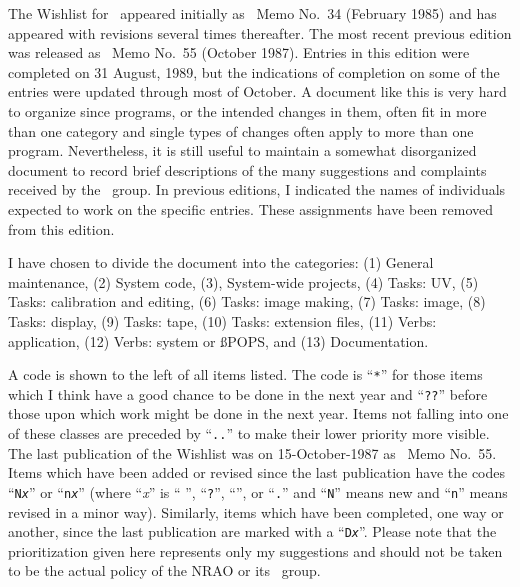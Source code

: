 \def\ust{{\rm st}}
\def\uth{{\rm th}}
\def\und{{\rm nd}}
\def\urd{{\rm rd}}
\def\fresh{\hfil\break}
\def\uv{{\it uv\/}}
\def\eg{{\it e.g.},}
\def\ie{{\it i.e.},}
\def\Uv{{\it Uv\/}}
\def\Eg{{\it E.g.},}
\def\Ie{{\it I.e.},}

\nopagenumbers

\def\stitle{NO STITLE}
\def\mdate{NO MDATE}
\def\ftitle{NO FTITLE}
\def\author{NO AUTHOR}
\def\stitle{\AIPS\ Wishlist}
\def\ftitle{The AIPS Wishlist}
\def\author{Eric W. Greisen}
\def\mdate{31 August 1989}
\def\memnumb{62}
\def\memnumc{\phantom{9}}
\memobegin


     The Wishlist for \AIPS\ appeared initially as \Aips\ Memo
No.~34 (February 1985) and has appeared with revisions several
times thereafter.  The most recent previous edition was released
as \AIPS\ Memo No.~55 (October 1987).  Entries in this edition were
completed on 31 August, 1989, but the indications of completion on
some of the entries were updated through most of October.  A document
like this is very hard to organize since programs, or the intended
changes in them, often fit in more than one category and single
types of changes often apply to more than one program.  Nevertheless,
it is still useful to maintain a somewhat disorganized document to
record brief descriptions of the many suggestions and complaints
received by the \AIPS\ group.  In previous editions, I indicated
the names of individuals expected to work on the specific entries.
These assignments have been removed from this edition.

     I have chosen to divide the document into the categories:
(1) General maintenance, (2) System code, (3), System-wide
projects, (4) Tasks: UV, (5) Tasks: calibration and editing,
(6) Tasks: image making, (7) Tasks: image, (8) Tasks: display,
(9) Tasks: tape, (10) Tasks: extension files, (11) Verbs:
application, (12) Verbs: system or {\ss POPS}, and (13)
Documentation.

     A code is shown to the left of all items listed.  The code
is ``{\tt **}'' for those items which I think have a good chance
to be done in the next year and ``{\tt ??}'' before those upon
which work might be done in the next year.  Items not falling
into one of these classes are preceded by ``{\tt ..}'' to make
their lower priority more visible.  The last publication of the
Wishlist was on 15-October-1987 as \AIPS\ Memo No.~55.  Items
which have been added or revised since the last publication
have the codes ``{\tt N{\it x}}'' or ``{\tt n{\it x}}'' (where
``{\it x}'' is `` '', ``{\tt ?}'', ``{\tt *}'', or ``{\tt .}''
and ``{\tt N}'' means new and ``{\tt n}'' means revised in a
minor way).  Similarly, items which have been completed, one
way or another, since the last publication are marked with a
``{\tt D{\it x}}''.  Please note that the prioritization given
here represents only my suggestions and should not be taken to
be the actual policy of the NRAO or its \AIPS\ group.

